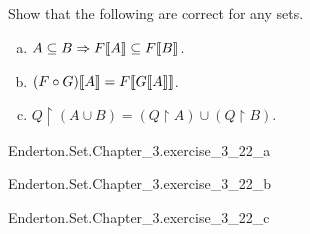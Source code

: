 \documentclass{report}
\begin{document}
\subsection{}%

  Show that the following are correct for any sets.
  \begin{enumerate}[(a)]
    \item $A \subseteq B \Rightarrow F\!\left\llbracket A\right\rrbracket \subseteq F\!\left\llbracket B\right\rrbracket$.
    \item $(F \circ G)\!\left\llbracket A\right\rrbracket = F\!\left\llbracket G\!\left\llbracket A\right\rrbracket\right\rrbracket$.
    \item $Q \restriction (A \cup B) =
      (Q \restriction A) \cup (Q \restriction B)$.
  \end{enumerate}

    {Enderton.Set.Chapter\_3.exercise\_3\_22\_a}

    {Enderton.Set.Chapter\_3.exercise\_3\_22\_b}

    {Enderton.Set.Chapter\_3.exercise\_3\_22\_c}
\end{document}
